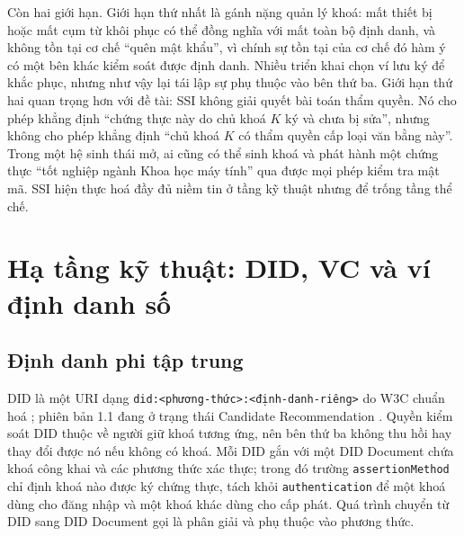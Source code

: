 Còn hai giới hạn. Giới hạn thứ nhất là gánh nặng quản lý khoá: mất thiết bị hoặc mất cụm từ khôi phục có thể đồng nghĩa với mất toàn bộ định danh, và không tồn tại cơ chế ``quên mật khẩu'', vì chính sự tồn tại của cơ chế đó hàm ý có một bên khác kiểm soát được định danh. Nhiều triển khai chọn ví lưu ký để khắc phục, nhưng như vậy lại tái lập sự phụ thuộc vào bên thứ ba. Giới hạn thứ hai quan trọng hơn với đề tài: SSI không giải quyết bài toán thẩm quyền. Nó cho phép khẳng định ``chứng thực này do chủ khoá $K$ ký và chưa bị sửa'', nhưng không cho phép khẳng định ``chủ khoá $K$ có thẩm quyền cấp loại văn bằng này''. Trong một hệ sinh thái mở, ai cũng có thể sinh khoá và phát hành một chứng thực ``tốt nghiệp ngành Khoa học máy tính'' qua được mọi phép kiểm tra mật mã. SSI hiện thực hoá đầy đủ niềm tin ở tầng kỹ thuật nhưng để trống tầng thể chế.

\section{Hạ tầng kỹ thuật: DID, VC và ví định danh số}
\label{sec:ha-tang}

\subsection{Định danh phi tập trung}

DID là một URI dạng \texttt{did:<phương-thức>:<định-danh-riêng>} do W3C chuẩn hoá \cite{W3C_DIDCore2022}; phiên bản 1.1 đang ở trạng thái Candidate Recommendation \cite{W3C_DID11_2026}. Quyền kiểm soát DID thuộc về người giữ khoá tương ứng, nên bên thứ ba không thu hồi hay thay đổi được nó nếu không có khoá. Mỗi DID gắn với một DID Document chứa khoá công khai và các phương thức xác thực; trong đó trường \texttt{assertionMethod} chỉ định khoá nào được ký chứng thực, tách khỏi \texttt{authentication} để một khoá dùng cho đăng nhập và một khoá khác dùng cho cấp phát. Quá trình chuyển từ DID sang DID Document gọi là phân giải \cite{W3C_DIDResolution} và phụ thuộc vào phương thức.

